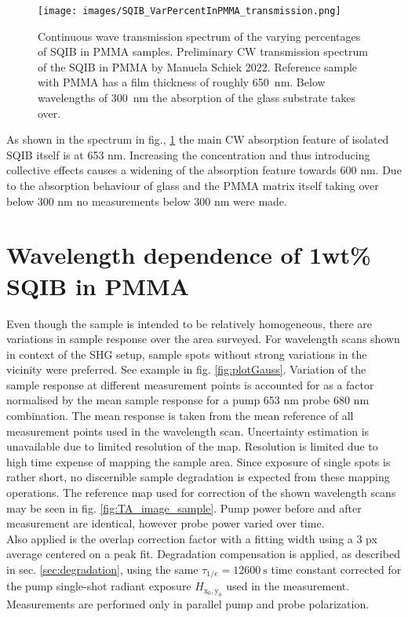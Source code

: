 \documentclass[twoside,openright,listof=numbered]{scrreprt}
\def\radiantExp{\ensuremath{H_\mathrm{x_0,y_0}}}
\begin{document}
\begin{figure}[!htp]
\centering
\texttt{[image: images/SQIB\_VarPercentInPMMA\_transmission.png]}
\caption[Continuous wave transmission spectrum of the varying percentages of SQIB in PMMA samples.]{Continuous wave transmission spectrum of the varying percentages of SQIB in PMMA samples.\label{fig:VarpercentCWspectrum} Preliminary CW transmission spectrum of the SQIB in PMMA by Manuela Schiek 2022.\cite{Schiek2022} Reference sample with PMMA has a film thickness of roughly \SI{650}{\nano\meter}. Below wavelengths of \qty{300}{\nano\meter} the absorption of the glass substrate takes over.}
\end{figure}

As shown in the spectrum in fig., \ref{fig:VarpercentCWspectrum} the main CW absorption feature of isolated SQIB itself is at 653 nm. Increasing the concentration and thus introducing collective effects causes a widening of the absorption feature towards 600 nm. Due to the absorption behaviour of glass and the PMMA matrix itself taking over below 300 nm no measurements below 300 nm were made.\\

\section{Wavelength dependence of 1wt\% SQIB in PMMA}


Even though the sample is intended to be relatively homogeneous, there are variations in sample response over the area surveyed. For wavelength scans shown in context of the SHG setup, sample spots without strong variations in the vicinity were preferred. See example in fig. \ref{fig:plotGauss}. Variation of the sample response at different measurement points is accounted for as a factor normalised by the mean sample response for a pump 653 nm probe 680 nm combination. The mean response is taken from the mean reference of all measurement points used in the wavelength scan. Uncertainty estimation is unavailable due to limited resolution of the map. Resolution is limited due to high time expense of mapping the sample area. Since exposure of single spots is rather short, no discernible sample degradation is expected from these mapping operations. The reference map used for correction of the shown wavelength scans may be seen in fig. \ref{fig:TA_image_sample}. Pump power before and after measurement are identical, however probe power varied over time.\\
Also applied is the overlap correction factor with a fitting width using a 3 px average centered on a peak fit. Degradation compensation is applied, as described in sec. \ref{sec:degradation}, using the same $\tau_{1/e} = \SI{12600}{\second}$ time constant corrected for the pump single-shot radiant exposure $\radiantExp$ used in the measurement.
Measurements are performed only in parallel pump and probe polarization.\\
\end{document}
